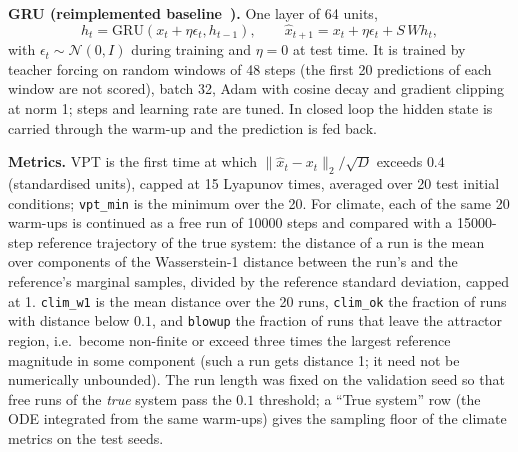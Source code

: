 \textbf{GRU (reimplemented baseline~\cite{cho2014learning}).} One layer of 64 units,
\begin{equation}
h_t=\mathrm{GRU}(x_t+\eta\epsilon_t,h_{t-1}),\qquad \hat x_{t+1}=x_t+\eta\epsilon_t+S\,W h_t,
\end{equation}
with $\epsilon_t\sim\mathcal N(0,I)$ during training and $\eta=0$ at test time. It is trained by teacher forcing on random windows of 48 steps (the first 20 predictions of each window are not scored), batch 32, Adam with cosine decay and gradient clipping at norm 1; steps and learning rate are tuned. In closed loop the hidden state is carried through the warm-up and the prediction is fed back.

\textbf{Metrics.} VPT is the first time at which $\|\hat x_t-x_t\|_2/\sqrt{D}$ exceeds $0.4$ (standardised units), capped at 15 Lyapunov times, averaged over 20 test initial conditions; \texttt{vpt\_min} is the minimum over the 20. For climate, each of the same 20 warm-ups is continued as a free run of 10000 steps and compared with a 15000-step reference trajectory of the true system: the distance of a run is the mean over components of the Wasserstein-1 distance between the run's and the reference's marginal samples, divided by the reference standard deviation, capped at 1. \texttt{clim\_w1} is the mean distance over the 20 runs, \texttt{clim\_ok} the fraction of runs with distance below $0.1$, and \texttt{blowup} the fraction of runs that leave the attractor region, i.e.\ become non-finite or exceed three times the largest reference magnitude in some component (such a run gets distance 1; it need not be numerically unbounded). The run length was fixed on the validation seed so that free runs of the \emph{true} system pass the $0.1$ threshold; a ``True system'' row (the ODE integrated from the same warm-ups) gives the sampling floor of the climate metrics on the test seeds.
